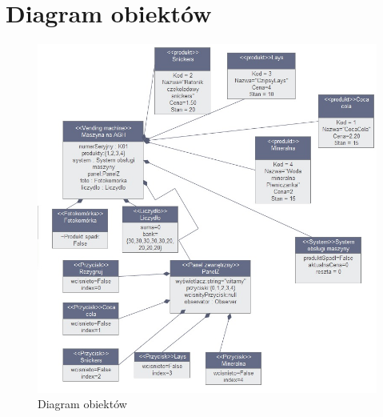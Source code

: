 \documentclass[a4paper, 11pt]{article}
\begin{document}
\section{Diagram obiektów}
\begin{figure}[H]
\includegraphics[scale=0.6]{../Diagrams/diagramObiektow}
\caption{Diagram obiektów}
\end{figure}


%
%
\end{document}
